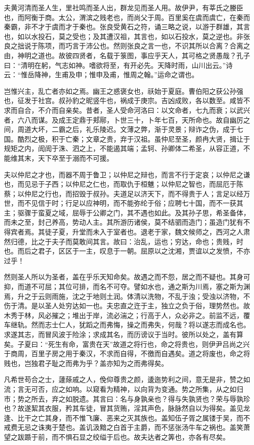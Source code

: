 \documentclass[UTF8,titlepage,oneside]{ctexbook}
\begin{document}
夫黄河清而圣人生，里社鸣而圣人出，群龙见而圣人用。故伊尹，有莘氏之媵臣也，而阿衡于商。太公，渭滨之贱老也，而尚父于周。百里奚在虞而虞亡，在秦而秦霸，非不才于虞而才于秦也。张良受黄石之符，诵三略之说，以游于群雄，其言也，如以水投石，莫之受也；及其遭汉祖，其言也，如以石投水，莫之逆也。非张良之拙说于陈项，而巧言于沛公也。然则张良之言一也，不识其所以合离？合离之由，神明之道也。故彼四贤者，名载于箓图，事应乎天人，其可格之贤愚哉？孔子曰：“清明在躬，气志如神。嗜欲将至，有开必先。天降时雨，山川出云。”诗云：“惟岳降神，生甫及申；惟申及甫，惟周之翰。”运命之谓也。

岂惟兴主，乱亡者亦如之焉。幽王之惑褒女也，祅始于夏庭。曹伯阳之获公孙强也，征发于社宫。叔孙豹之昵竖牛也，祸成于庚宗。吉凶成败，各以数至。咸皆不求而自合，不介而自亲矣。昔者，圣人受命河洛曰：以文命者，七九而衰；以武兴者，六八而谋。及成王定鼎于郏鄏，卜世三十，卜年七百，天所命也。故自幽厉之间，周道大坏，二霸之后，礼乐陵迟。文薄之弊，渐于灵景；辩诈之伪，成于七国。酷烈之极，积于亡秦；文章之贵，弃于汉祖。虽仲尼至圣，颜冉大贤，揖让于规矩之内，訚訚于洙、泗之上，不能遏其端；孟轲、孙卿体二希圣，从容正道，不能维其末，天下卒至于溺而不可援。

夫以仲尼之才也，而器不周于鲁卫；以仲尼之辩也，而言不行于定哀；以仲尼之谦也，而见忌于子西；以仲尼之仁也，而取仇于桓魋；以仲尼之智也，而屈厄于陈蔡；以仲尼之行也，而招毁于叔孙。夫道足以济天下，而不得贵于人；言足以经万世，而不见信于时；行足以应神明，而不能弥纶于俗；应聘七十国，而不一获其主；驱骤于蛮夏之域，屈辱于公卿之门，其不遇也如此。及其孙子思，希圣备体，而未之至，封己养高，势动人主。其所游历诸侯，莫不结驷而造门；虽造门犹有不得宾者焉。其徒子夏，升堂而未入于室者也。退老于家，魏文候师之，西河之人肃然归德，比之于夫子而莫敢间其言。故曰：治乱，运也；穷达，命也；贵贱，时也。而后之君子，区区于一主，叹息于一朝。屈原以之沈湘，贾谊以之发愤，不亦过乎！

然则圣人所以为圣者，盖在乎乐天知命矣。故遇之而不怨，居之而不疑也。其身可抑，而道不可屈；其位可排，而名不可夺。譬如水也，通之斯为川焉，塞之斯为渊焉，升之于云则雨施，沈之于地则土润。体清以洗物，不乱于浊；受浊以济物，不伤于清。是以圣人处穷达如一也。夫忠直之迕于主，独立之负于俗，理势然也。故木秀于林，风必摧之；堆出于岸，流必湍之；行高于人，众必非之。前监不远，覆车继轨。然而志士仁人，犹蹈之而弗悔，操之而弗失，何哉？将以遂志而成名也。求遂其志，而冒风波于险涂；求成其名，而历谤议于当时。彼所以处之，盖有算矣。子夏曰：“死生有命，富贵在天”故道之将行也，命之将贵也，则伊尹吕尚之兴于商周，百里子房之用于秦汉，不求而自得，不徼而自遇矣。道之将废也，命之将贱也，岂独君子耻之而弗为乎？盖亦知为之而弗得矣。

凡希世苟合之士，蘧蒢戚之人，俛仰尊贵之颜，逶迤势利之间，意无是非，赞之如流；言无可否，应之如响。以窥看为精神，以向背为变通。势之所集，从之如归市；势之所去，弃之如脱遗。其言曰：名与身孰亲也？得与失孰贤也？荣与辱孰珍也？故遂絜其衣服，矜其车徒，冒其货贿，淫其声色，脉脉然自以为得矣。盖见龙逢、比干之亡其身，而不惟飞廉、恶来之灭其族也。盖知伍子胥之属镂于吴，而不戒费无忌之诛夷于楚也。盖讥汲黯之白首于主爵，而不惩张汤牛车之祸也。盖笑萧望之跋踬于前，而不惧石显之绞缢于后也。故夫达者之筭也，亦各有尽矣。
\end{document}
